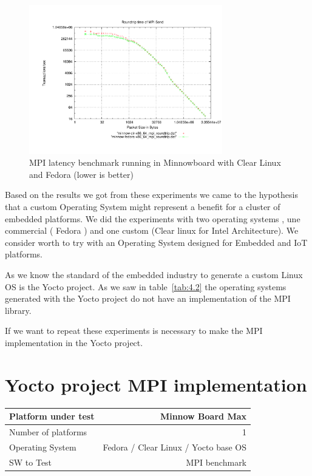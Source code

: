 \begin{figure}[H]
\centering
\includegraphics[width=0.75\textwidth]{images/mpbench_clr_experiments/mpi_roundtrip.pdf}
\caption{MPI latency benchmark running in Minnowboard with Clear Linux and
Fedora (lower is better)}
\label{mpi_roundtrip_clr_fedora}
\end{figure}

Based on the results we got from these experiments we came to the hypothesis
that a custom Operating System might represent a benefit for a cluster of
embedded platforms. We did the experiments with two operating systems , une
commercial ( Fedora ) and one custom (Clear linux for Intel Architecture). We
consider worth to try with an Operating System designed for Embedded and IoT
platforms. 

As we know the standard of the embedded industry to generate a custom Linux OS
is the Yocto project. As we saw in table~\ref{tab:4.2} the operating systems
generated with the Yocto project do not have an implementation of the MPI
library. 

If we want to repeat these experiments is necessary to make the MPI
implementation in the Yocto project. 


\section{Yocto project MPI implementation}

    \begin{center}
    \begin{tabular}{ | l | r |}
        \hline
        Platform under test & Minnow Board  Max \\ \hline
        Number of platforms  & 1  \\ \hline
        Operating System & Fedora / Clear Linux / Yocto base OS  \\ \hline
        SW to Test & MPI benchmark \\ \hline
    \end{tabular}
    \end{center}

